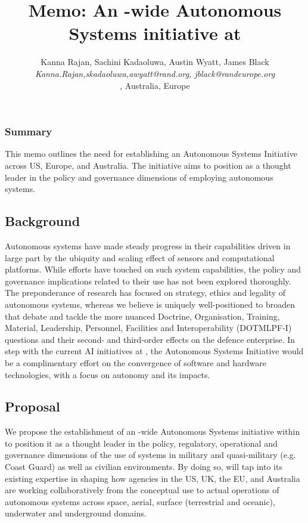\documentclass[11pt,letterpaper]{article}
\title{Memo: An \auke-wide Autonomous Systems initiative at \org}
\author{\textsf{\large{Kanna Rajan, Sachini Kadaoluwa, Austin Wyatt,
      James Black}}\\
  \emph{{Kanna.Rajan,skadaoluwa,awyatt}@rand.org, jblack@randeurope.org}\\
  \orge, \org Australia, \org Europe
  }
\begin{document}
\maketitle{}

\subsubsection{Summary}

This memo outlines the need for establishing an Autonomous Systems
Initiative across \org US, Europe, and Australia. The initiative aims
to position \org as a thought leader in the policy and governance
dimensions of employing autonomous systems.

\subsection{Background}

Autonomous systems have made steady progress in their capabilities
driven in large part by the ubiquity and scaling effect of sensors and
computational platforms. While \org efforts have touched on such
system capabilities, the policy and governance implications related to
their use has not been explored thoroughly. The preponderance of
research has focused on strategy, ethics and legality of autonomous
systems, whereas we believe \org is uniquely well-positioned to
broaden that debate and tackle the more nuanced Doctrine,
Organisation, Training, Material, Leadership, Personnel, Facilities
and Interoperability (DOTMLPF-I) questions and their second- and
third-order effects on the defence enterprise. In step with the
current AI initiatives at \org, the Autonomous Systems Initiative
would be a complimentary effort on the convergence of software and
hardware technologies, with a focus on autonomy and its impacts.


\subsection{Proposal}

We propose the establishment of an \auke-wide Autonomous Systems
initiative within \org to position it as a thought leader in the
policy, regulatory, operational and governance dimensions of the use
of systems in military and quasi-military (e.g. Coast Guard) as well
as civilian environments. By doing so, \org will tap into its existing
expertise in shaping how agencies in the US, UK, the EU, and Australia
are working collaboratively from the conceptual use to actual
operations of autonomous systems across space, aerial, surface
(terrestrial and oceanic), underwater and underground domains.
\end{document}
